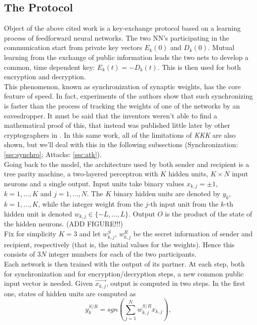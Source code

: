 \documentclass[%
    corpo=11pt,
    twoside,
    stile=classica,
    oldstyle,
    autoretitolo,
    tipotesi=magistrale,
    greek,
    evenboxes,
    english
]{toptesi}
\begin{document}
\subsection{The Protocol}
Object of the above cited work is a key-exchange protocol based on a learning process of feedforward neural networks. The two NN's participating in the communication start from private key vectors $E_k(0)$ and $D_k(0)$. Mutual learning from the exchange of public information leads the two nets to develop a common, time dependent key: $E_k(t) = - D_k(t)$. This is then used for both encryption and decryption. \\
This phenomenon, known as synchronization of synaptic weights, has the core feature of speed. In fact, experiments of the authors show that such synchronizing is faster than the process of tracking the weights of one of the networks by an eavesdropper. It must be said that the inventors weren't able to find a mathematical proof of this, that instead was published little later by other cryptographers in \cite{shamir}. In this same work, all of the limitations of \textit{KKK} are also shown, but we'll deal with this in the following subsections (Synchronization: \ref{ssc:synchro}; Attacks: \ref{ssc:atk}).  \\
Going back to the model, the architecture used by both sender and recipient is a tree parity machine, a two-layered perceptron with $K$ hidden units, $K \times N$ input neurons and a single output. Input units take binary values $x_{k,j} = \pm 1$, $k = 1,\dots, K$ and $j = 1, \dots, N$. The $K$ binary hidden units are denoted by $y_k$, $k = 1,\dots, K$, while the integer weight from the $j$-th input unit from the $k$-th hidden unit is denoted $w_{k,j}\in\{-L,\dots,L\}$. Output $O$ is the product of the state of the hidden neurons. (ADD FIGURE!!!) \\
Fix for simplicity $K = 3$ and let $w_{k,j}^S$, $w_{k,j}^R$ be the secret information of sender and recipient, respectively (that is, the initial values for the weights). Hence this consists of $3N$ integer numbers for each of the two participants. \\
Each network is then trained with the output of its partner. At each step, both for synchronization and for encryption/decryption steps, a new common public input vector is needed. Given $\vec{x_{k,j}}$, output is computed in two steps. In the first one, states of hidden units are computed as 
\begin{equation}
y_k^{S/R} = sgn\left(\sum_{j=1}^{N}w_{k,j}^{S/R}x_{k,j}\right),
\end{equation}
\end{document}
